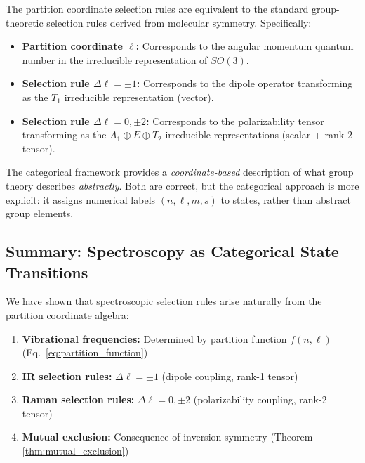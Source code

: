 \documentclass[twocolumn,10pt]{article}
\theoremstyle{remark}
\begin{document}
The partition coordinate selection rules are equivalent to the standard group-theoretic selection rules derived from molecular symmetry. Specifically:

\begin{itemize}
    \item \textbf{Partition coordinate $\ell$:} Corresponds to the angular momentum quantum number in the irreducible representation of $SO(3)$.
    
    \item \textbf{Selection rule $\Delta \ell = \pm 1$:} Corresponds to the dipole operator transforming as the $T_1$ irreducible representation (vector).
    
    \item \textbf{Selection rule $\Delta \ell = 0, \pm 2$:} Corresponds to the polarizability tensor transforming as the $A_1 \oplus E \oplus T_2$ irreducible representations (scalar + rank-2 tensor).
\end{itemize}

The categorical framework provides a \textit{coordinate-based} description of what group theory describes \textit{abstractly}. Both are correct, but the categorical approach is more explicit: it assigns numerical labels $(n, \ell, m, s)$ to states, rather than abstract group elements.

\subsection{Summary: Spectroscopy as Categorical State Transitions}

We have shown that spectroscopic selection rules arise naturally from the partition coordinate algebra:

\begin{enumerate}
    \item \textbf{Vibrational frequencies:} Determined by partition function $f(n, \ell)$ (Eq.~\ref{eq:partition_function})
    
    \item \textbf{IR selection rules:} $\Delta \ell = \pm 1$ (dipole coupling, rank-1 tensor)
    
    \item \textbf{Raman selection rules:} $\Delta \ell = 0, \pm 2$ (polarizability coupling, rank-2 tensor)
    
    \item \textbf{Mutual exclusion:} Consequence of inversion symmetry (Theorem \ref{thm:mutual_exclusion})
\end{enumerate}
\end{document}
